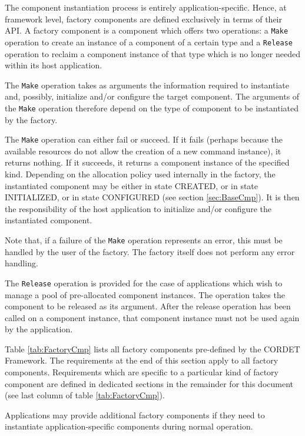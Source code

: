 \documentclass[a4paper,10pt]{article}
\begin{document}
The component instantiation process is entirely application-specific. 
Hence, at framework level, factory components are defined exclusively in terms of their API. A factory component is a component which offers two operations: a \texttt{Make} operation to create an instance of a component of a certain type and a \texttt{Release} operation to reclaim a component instance of that type which is no longer needed within its host application.

The \texttt{Make} operation takes as arguments the information required to instantiate and, possibly, initialize and/or configure the target component. The arguments of the \texttt{Make} operation therefore depend on the type of component to be instantiated by the factory.

The \texttt{Make} operation can either fail or succeed. If it fails (perhaps because the available resources do not allow the creation of a new command instance), it returns nothing. If it succeeds, it returns a component instance of the specified kind. Depending on the allocation policy used internally in the factory, the instantiated component may be either in state CREATED, or in state INITIALIZED, or in state CONFIGURED (see section \ref{sec:BaseCmp}). It is then the responsibility of the host application to initialize and/or configure the instantiated component.

Note that, if a failure of the \texttt{Make} operation represents an error, this must be handled by the user of the factory. The factory itself does not perform any error handling.

The \texttt{Release} operation is provided for the case of applications which wish to manage a pool of pre-allocated component instances. The operation takes the component to be released as its argument. After the release operation has been called on a component instance, that component instance must not be used again by the application. 

Table \ref{tab:FactoryCmp} lists all factory components pre-defined by the CORDET Framework. The requirements at the end of this section apply to all factory components. 
Requirements which are specific to a particular kind of factory component are defined in dedicated sections in the remainder for this document (see last column of table \ref{tab:FactoryCmp}). 

Applications may provide additional factory components if they need to instantiate application-specific components during normal operation.
\end{document}
